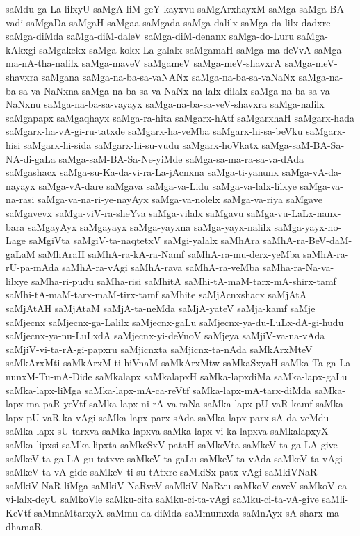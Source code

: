 {saMdu-ga-La-lilxyU
saMgA-liM-geY-kayxvu
saMgArxhayxM
saMga
saMga-BA-vadi
saMgaDa
saMgaH
saMgaa
saMgada
saMga-dalilx
saMga-da-lilx-dadxre
saMga-diMda
saMga-diM-daleV
saMga-diM-denanx
saMga-do-Luru
saMga-kAkxgi
saMgakekx
saMga-kokx-La-galalx
saMgamaH
saMga-ma-deVvA
saMga-ma-nA-tha-nalilx
saMga-maveV
saMgameV
saMga-meV-shavxrA
saMga-meV-shavxra
saMgana
saMga-na-ba-sa-vaNANx
saMga-na-ba-sa-vaNaNx
saMga-na-ba-sa-va-NaNxna
saMga-na-ba-sa-va-NaNx-na-lalx-dilalx
saMga-na-ba-sa-va-NaNxnu
saMga-na-ba-sa-vayayx
saMga-na-ba-sa-veV-shavxra
saMga-nalilx
saMgapapx
saMgaqhayx
saMga-ra-hita
saMgarx-hAtf
saMgarxhaH
saMgarx-hada
saMgarx-ha-vA-gi-ru-tatxde
saMgarx-ha-veMba
saMgarx-hi-sa-beVku
saMgarx-hisi
saMgarx-hi-sida
saMgarx-hi-su-vudu
saMgarx-hoVkatx
saMga-saM-BA-Sa-NA-di-gaLa
saMga-saM-BA-Sa-Ne-yiMde
saMga-sa-ma-ra-sa-va-dAda
saMgashacx
saMga-su-Ka-da-vi-ra-La-jAcnxna
saMga-ti-yanunx
saMga-vA-da-nayayx
saMga-vA-dare
saMgava
saMga-va-Lidu
saMga-va-lalx-lilxye
saMga-va-na-rasi
saMga-va-na-ri-ye-nayAyx
saMga-va-nolelx
saMga-va-riya
saMgave
saMgavevx
saMga-viV-ra-sheYva
saMga-vilalx
saMgavu
saMga-vu-LaLx-nanx-bara
saMgayAyx
saMgayayx
saMga-yayxna
saMga-yayx-nalilx
saMga-yayx-no-Lage
saMgiVta
saMgiV-ta-naqtetxV
saMgi-yalalx
saMhAra
saMhA-ra-BeV-daM-gaLaM
saMhAraH
saMhA-ra-kA-ra-Namf
saMhA-ra-mu-derx-yeMba
saMhA-ra-rU-pa-mAda
saMhA-ra-vAgi
saMhA-rava
saMhA-ra-veMba
saMha-ra-Na-va-lilxye
saMha-ri-pudu
saMha-risi
saMhitA
saMhi-tA-maM-tarx-mA-shirx-tamf
saMhi-tA-maM-tarx-maM-tirx-tamf
saMhite
saMjAcnxshacx
saMjAtA
saMjAtAH
saMjAtaM
saMjA-ta-neMda
saMjA-yateV
saMja-kamf
saMje
saMjecnx
saMjecnx-ga-Lalilx
saMjecnx-gaLu
saMjecnx-ya-du-LuLx-dA-gi-hudu
saMjecnx-ya-nu-LuLxdA
saMjecnx-yi-deVnoV
saMjeya
saMjiV-va-na-vAda
saMjiV-vi-ta-rA-gi-papxru
saMjicnxta
saMjicnx-ta-nAda
saMkArxMteV
saMkArxMti
saMkArxM-ti-hiVnaM
saMkArxMtw
saMkaSxyaH
saMka-Ta-ga-La-nunxM-Tu-mA-Dide
saMkalapx
saMkalapxH
saMka-lapxdiMa
saMka-lapx-gaLu
saMka-lapx-liMga
saMka-lapx-mA-ca-reVtf
saMka-lapx-mA-tarx-diMda
saMka-lapx-ma-paR-yeVtf
saMka-lapx-ni-rA-va-raNa
saMka-lapx-pU-vaR-kamf
saMka-lapx-pU-vaR-ka-vAgi
saMka-lapx-parx-sAda
saMka-lapx-parx-sA-da-veMdu
saMka-lapx-sU-tarxva
saMka-lapxva
saMka-lapx-vi-ka-lapxva
saMkalapxyX
saMka-lipxsi
saMka-lipxta
saMkeSxV-pataH
saMkeVta
saMkeV-ta-ga-LA-give
saMkeV-ta-ga-LA-gu-tatxve
saMkeV-ta-gaLu
saMkeV-ta-vAda
saMkeV-ta-vAgi
saMkeV-ta-vA-gide
saMkeV-ti-su-tAtxre
saMkiSx-patx-vAgi
saMkiVNaR
saMkiV-NaR-liMga
saMkiV-NaRveV
saMkiV-NaRvu
saMkoV-caveV
saMkoV-ca-vi-lalx-deyU
saMkoVle
saMku-cita
saMku-ci-ta-vAgi
saMku-ci-ta-vA-give
saMli-KeVtf
saMmaMtarxyX
saMmu-da-diMda
saMmumxda
saMnAyx-sA-sharx-ma-dhamaR
}
